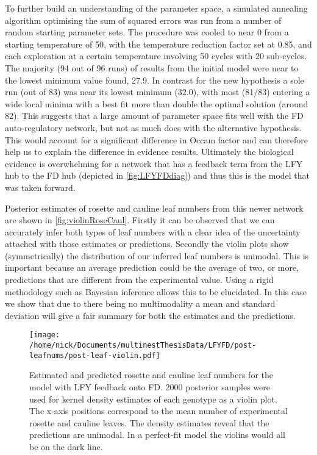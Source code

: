 To further build an understanding of the parameter space, a simulated annealing algorithm \cite{kirkpatrick1983,goffe1994} optimising the sum of squared errors was run from a number of random starting parameter sets.
The procedure was cooled to near 0 from a starting temperature of 50, with the temperature reduction factor set at 0.85, and each exploration at a certain temperature involving 50 cycles with 20 sub-cycles.
The majority (94 out of 96 runs) of results from the initial model were near to the lowest minimum value found, 27.9.
In contrast for the new hypothesis a sole run (out of 83) was near its lowest minimum (32.0), with most (81/83) entering a wide local minima with a best fit more than double the optimal solution (around 82).
This suggests that a large amount of parameter space fits well with the FD auto-regulatory network, but not as much does with the alternative hypothesis.
This would account for a significant difference in Occam factor and can therefore help us to explain the difference in evidence results.
Ultimately the biological evidence is overwhelming for a network that has a feedback term from the LFY hub to the FD hub (depicted in \autoref{fig:LFYFDdiag}) and thus this is the model that was taken forward.

Posterior estimates of rosette and cauline leaf numbers from this newer network are shown in \autoref{fig:violinRoseCaul}.
Firstly it can be observed that we can accurately infer both types of leaf numbers with a clear idea of the uncertainty attached with those estimates or predictions.
Secondly the violin plots show (symmetrically) the distribution of our inferred leaf numbers is unimodal.
This is important because an average prediction could be the average of two, or more, predictions that are different from the experimental value.
Using a rigid methodology such as Bayesian inference allows this to be elucidated.
In this case we show that due to there being no multimodality a mean and standard deviation will give a fair summary for both the estimates and the predictions.
\begin{figure*}[!htbp]
\centering
\texttt{[image: /home/nick/Documents/multinestThesisData/LFYFD/post-leafnums/post-leaf-violin.pdf]}
\caption{Estimated and predicted rosette and cauline leaf numbers for the model with LFY feedback onto FD.
2000 posterior samples were used for kernel density estimates of each genotype as a violin plot.
The x-axis positions correspond to the mean number of experimental rosette and cauline leaves.
The density estimates reveal that the predictions are unimodal.
In a perfect-fit model the violins would all be on the dark line.
}
\label{fig:violinRoseCaul}
\end{figure*}

